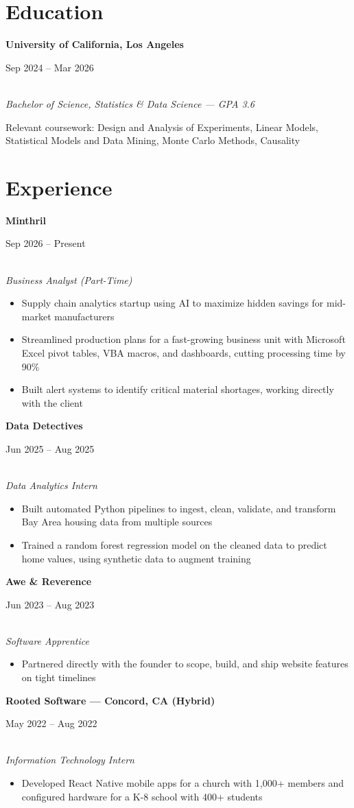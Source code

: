 \documentclass[11pt,letterpaper]{article}
\newcommand{\entry}[3]{%
  \noindent\begin{minipage}[t]{0.72\textwidth}\raggedright\textbf{#1}\end{minipage}%
  \hfill\begin{minipage}[t]{0.26\textwidth}\raggedleft\small\color{gray}#2\end{minipage}\\
  \textit{#3}\par\vspace{2pt}
}
\newcommand{\entryhl}[3]{%
  \noindent\begin{minipage}[t]{0.72\textwidth}\raggedright\textbf{\color{accent}#1}\end{minipage}%
  \hfill\begin{minipage}[t]{0.26\textwidth}\raggedleft\small\color{gray}#2\end{minipage}\\
  \textit{#3}\par\vspace{2pt}
}
\begin{document}


\vspace{4pt}

\section*{Education}
\entry{University of California, Los Angeles}{Sep 2024 -- Mar 2026}{Bachelor of Science, Statistics \& Data Science --- GPA 3.6}
\small Relevant coursework: Design and Analysis of Experiments, Linear Models, Statistical Models and Data Mining, Monte Carlo Methods, Causality

\section*{Experience}

\entryhl{Minthril}{Sep 2026 -- Present}{Business Analyst (Part-Time)}
\begin{itemize}
  \item Supply chain analytics startup using AI to maximize hidden savings for mid-market manufacturers
  \item Streamlined production plans for a fast-growing business unit with Microsoft Excel pivot tables, VBA macros, and dashboards, cutting processing time by 90\%
  \item Built alert systems to identify critical material shortages, working directly with the client
\end{itemize}

\entry{Data Detectives}{Jun 2025 -- Aug 2025}{Data Analytics Intern}
\begin{itemize}
  \item Built automated Python pipelines to ingest, clean, validate, and transform Bay Area housing data from multiple sources
  \item Trained a random forest regression model on the cleaned data to predict home values, using synthetic data to augment training
\end{itemize}

\entry{Awe \& Reverence}{Jun 2023 -- Aug 2023}{Software Apprentice}
\begin{itemize}
  \item Partnered directly with the founder to scope, build, and ship website features on tight timelines
\end{itemize}

\entry{Rooted Software --- Concord, CA (Hybrid)}{May 2022 -- Aug 2022}{Information Technology Intern}
\begin{itemize}
  \item Developed React Native mobile apps for a church with 1,000+ members and configured hardware for a K-8 school with 400+ students
\end{itemize}
\end{document}
